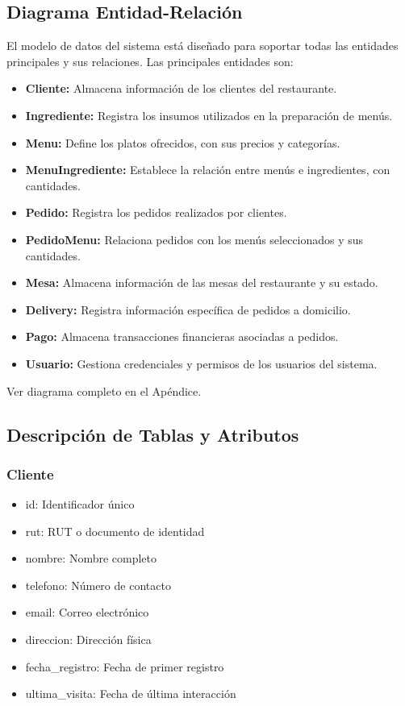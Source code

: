 \documentclass[12pt]{article}
\begin{document}
\subsection{Diagrama Entidad-Relación}
El modelo de datos del sistema está diseñado para soportar todas las entidades principales y sus relaciones. Las principales entidades son:

\begin{itemize}
  \item \textbf{Cliente:} Almacena información de los clientes del restaurante.
  \item \textbf{Ingrediente:} Registra los insumos utilizados en la preparación de menús.
  \item \textbf{Menu:} Define los platos ofrecidos, con sus precios y categorías.
  \item \textbf{MenuIngrediente:} Establece la relación entre menús e ingredientes, con cantidades.
  \item \textbf{Pedido:} Registra los pedidos realizados por clientes.
  \item \textbf{PedidoMenu:} Relaciona pedidos con los menús seleccionados y sus cantidades.
  \item \textbf{Mesa:} Almacena información de las mesas del restaurante y su estado.
  \item \textbf{Delivery:} Registra información específica de pedidos a domicilio.
  \item \textbf{Pago:} Almacena transacciones financieras asociadas a pedidos.
  \item \textbf{Usuario:} Gestiona credenciales y permisos de los usuarios del sistema.
\end{itemize}

Ver diagrama completo en el Apéndice.

\subsection{Descripción de Tablas y Atributos}

\subsubsection{Cliente}
\begin{itemize}
  \item id: Identificador único
  \item rut: RUT o documento de identidad
  \item nombre: Nombre completo
  \item telefono: Número de contacto
  \item email: Correo electrónico
  \item direccion: Dirección física
  \item fecha\_registro: Fecha de primer registro
  \item ultima\_visita: Fecha de última interacción
\end{itemize}
\end{document}
